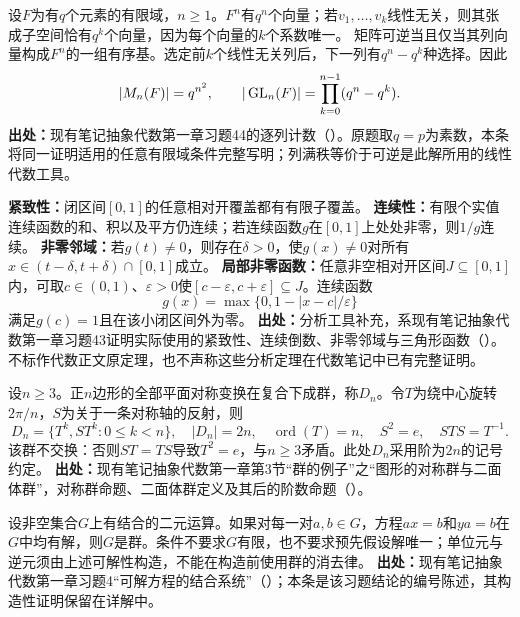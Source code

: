\begin{reviewprop}[有限域中的线性无关列与有序基计数]\label{tool:g-basis-count}
设$F$为有$q$个元素的有限域，$n\geq1$。$F^n$有$q^n$个向量；若$v_1,\ldots,v_k$线性无关，则其张成子空间恰有$q^k$个向量，因为每个向量的$k$个系数唯一。
矩阵可逆当且仅当其列向量构成$F^n$的一组有序基。选定前$k$个线性无关列后，下一列有$q^n-q^k$种选择。因此
\[
|M_n(F)|=q^{n^2},\qquad
|\operatorname{GL}_n(F)|=\prod_{k=0}^{n-1}(q^n-q^k).
\]
\textbf{出处：}现有笔记抽象代数第一章习题44的逐列计数（）。原题取$q=p$为素数，本条将同一证明适用的任意有限域条件完整写明；列满秩等价于可逆是此解所用的线性代数工具。
\end{reviewprop}

\begin{reviewprop}[连续函数环所用的分析工具（补充）]\label{tool:g-analysis}
\textbf{紧致性：}闭区间$[0,1]$的任意相对开覆盖都有有限子覆盖。
\textbf{连续性：}有限个实值连续函数的和、积以及平方仍连续；若连续函数$g$在$[0,1]$上处处非零，则$1/g$连续。
\textbf{非零邻域：}若$g(t)\ne0$，则存在$\delta>0$，使$g(x)\ne0$对所有$x\in(t-\delta,t+\delta)\cap[0,1]$成立。
\textbf{局部非零函数：}任意非空相对开区间$J\subseteq[0,1]$内，可取$c\in(0,1)$、$\varepsilon>0$使$[c-\varepsilon,c+\varepsilon]\subseteq J$。连续函数
\[
g(x)=\max\{0,1-|x-c|/\varepsilon\}
\]
满足$g(c)=1$且在该小闭区间外为零。
\textbf{出处：}分析工具补充，系现有笔记抽象代数第一章习题43证明实际使用的紧致性、连续倒数、非零邻域与三角形函数（）。不标作代数正文原定理，也不声称这些分析定理在代数笔记中已有完整证明。
\end{reviewprop}

\begin{reviewprop}[正多边形的几何二面体群]\label{tool:g-dihedral}
设$n\geq3$。正$n$边形的全部平面对称变换在复合下成群，称$D_n$。令$T$为绕中心旋转$2\pi/n$，$S$为关于一条对称轴的反射，则
\[
D_n=\{T^k,ST^k:0\leq k<n\},\quad |D_n|=2n,\quad
\operatorname{ord}(T)=n,\quad S^2=e,\quad STS=T^{-1}.
\]
该群不交换：否则$ST=TS$导致$T^2=e$，与$n\geq3$矛盾。此处$D_n$采用阶为$2n$的记号约定。
\textbf{出处：}现有笔记抽象代数第一章第3节“群的例子”之“图形的对称群与二面体群”，对称群命题、二面体群定义及其后的阶数命题（）。
\end{reviewprop}

\begin{reviewtheorem}[由方程可解性判定群]\label{tool:g-group-construction}
设非空集合$G$上有结合的二元运算。如果对每一对$a,b\in G$，方程$ax=b$和$ya=b$在$G$中均有解，则$G$是群。条件不要求$G$有限，也不要求预先假设解唯一；单位元与逆元须由上述可解性构造，不能在构造前使用群的消去律。
\textbf{出处：}现有笔记抽象代数第一章习题4“可解方程的结合系统”（）；本条是该习题结论的编号陈述，其构造性证明保留在详解中。
\end{reviewtheorem}
